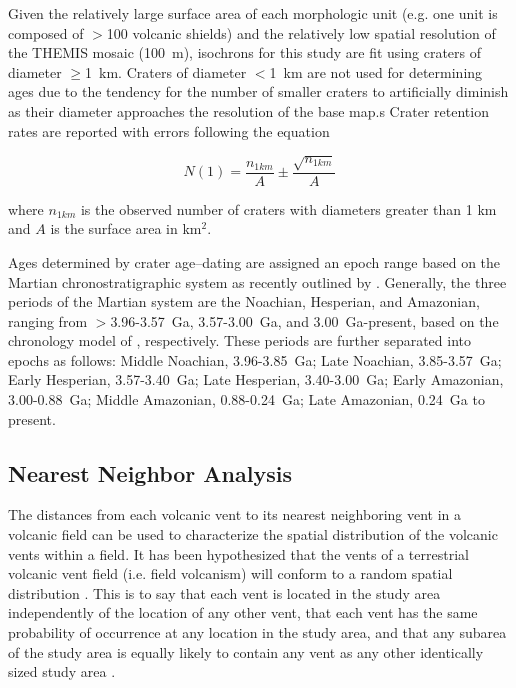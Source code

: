 \documentclass[preprint,review,authoryear,12pt]{elsarticle}
\begin{document}
Given the relatively large surface area of each morphologic unit (e.g. one unit is composed of $>$100 volcanic shields) and the relatively low spatial resolution of the THEMIS mosaic (100~m), isochrons for this study are fit using craters of diameter $\ge$1~km. Craters of diameter $<$1~km are not used for determining ages due to the tendency for the number of smaller craters to artificially diminish as their diameter approaches the resolution of the base map.s Crater retention rates are reported with errors following the equation
\begin{linenomath*}\begin{equation}
N(1) = \frac{n_{1km}}{A} \pm \frac{\sqrt{n_{1km}}}{A} \label{eq1}
\end{equation}\end{linenomath*} where $n_{1km}$ is the observed number of craters with diameters greater than 1 km and $A$ is the surface area in km$^2$.

Ages determined by crater age--dating are assigned an epoch range based on the Martian chronostratigraphic system as recently outlined by \citet{Werner2011}. Generally, the three periods of the Martian system are the Noachian, Hesperian, and Amazonian, ranging from $>$3.96-3.57~Ga, 3.57-3.00~Ga, and 3.00~Ga-present, based on the chronology model of \citet{Hartmann2005}, respectively. These periods are further separated into epochs as follows: Middle Noachian, 3.96-3.85~Ga; Late Noachian, 3.85-3.57~Ga; Early Hesperian, 3.57-3.40~Ga; Late Hesperian, 3.40-3.00~Ga; Early Amazonian, 3.00-0.88~Ga; Middle Amazonian, 0.88-0.24~Ga; Late Amazonian, 0.24~Ga to present.

\subsection{Nearest Neighbor Analysis}
\label{sec:methodNN}

The distances from each volcanic vent to its nearest neighboring vent in a volcanic field can be used to characterize the spatial distribution of the volcanic vents within a field. It has been hypothesized that the vents of a terrestrial volcanic vent field (i.e. field volcanism) will conform to a random spatial distribution \citep{Lutz1986,Lutz1995}. This is to say that each vent is located in the study area independently of the location of any other vent, that each vent has the same probability of occurrence at any location in the study area, and that any subarea of the study area is equally likely to contain any vent as any other identically sized study area \citep{Clark1954}.
\end{document}
